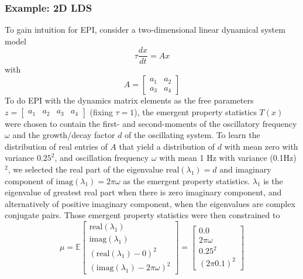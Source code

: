 \documentclass[11pt]{article}
\begin{document}

\subsubsection{Example: 2D LDS}\label{methods_2DLDS}
To gain intuition for EPI, consider a two-dimensional linear dynamical system model 
\begin{equation} 
\tau \frac{dx}{dt} = Ax
\end{equation}
with
\begin{equation}
A = \begin{bmatrix} a_1 & a_2 \\ a_3 & a_4 \end{bmatrix}
\end{equation}
To do EPI with the dynamics matrix elements as the free parameters $z = \begin{bmatrix} a_1 & a_2 & a_3 & a_4 \end{bmatrix}$ (fixing $\tau=1$), the emergent property statistics $T(x)$ were chosen to contain the first- and second-moments of the oscillatory frequency $\omega$ and the growth/decay factor $d$ of the oscillating system.  To learn the distribution of real entries of $A$ that yield a distribution of $d$ with mean zero with variance $0.25^2$, and oscillation frequency $\omega$ with mean 1 Hz with variance (0.1Hz)$^2$, we selected the real part of the  eigenvalue $\text{real}(\lambda_1) = d$ and imaginary component of  $\text{imag}(\lambda_1) = 2 \pi \omega$ as the emergent property statistics.  $\lambda_1$ is the eigenvalue of greatest real part when there is zero imaginary component, and alternatively of positive imaginary component, when the eigenvalues are complex conjugate pairs.  Those emergent property statistics were then constrained to
\begin{equation}
 \mu = \mathbb{E} \begin{bmatrix} \text{real}(\lambda_1) \\ \text{imag}(\lambda_1) \\ (\text{real}(\lambda_1)-0)^2  \\ (\text{imag}(\lambda_1)-2 \pi \omega)^2 \end{bmatrix} = \begin{bmatrix} 0.0 \\ 2 \pi \omega \\ 0.25^2 \\ (2 \pi 0.1)^2 \end{bmatrix}
 \end{equation} 
\end{document}
